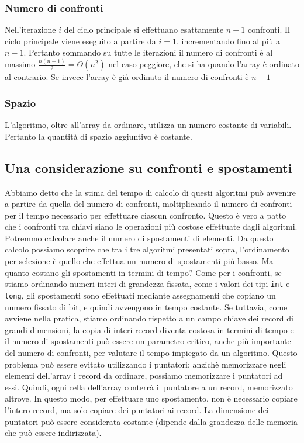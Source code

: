 \subsubsection*{Numero di confronti}
Nell'iterazione $i$ del ciclo principale si effettuano esattamente $n - 1$ confronti.
Il ciclo principale viene eseguito a partire da $i = 1$, incrementando fino al più
a $n - 1$. Pertanto sommando su tutte le iterazioni il numero di confronti è al massimo $\frac{n(n-1)}{2} = \Theta(n^2)$
nel caso peggiore, che si ha quando l'array è ordinato al contrario.
Se invece l'array è già ordinato il numero di confronti è $n - 1$ 

\subsubsection*{Spazio}
L'algoritmo, oltre all'array da ordinare, utilizza un numero costante di variabili.
Pertanto la quantità di spazio aggiuntivo è costante.
\clearpage

\subsection{Una considerazione su confronti e spostamenti}
Abbiamo detto che la stima del tempo di calcolo di questi algoritmi 
può avvenire a partire da quella del numero di confronti, 
moltiplicando il numero di confronti per il tempo necessario per 
effettuare ciascun confronto. Questo è vero a patto che i confronti tra chiavi 
siano le operazioni più costose effettuate dagli algoritmi. 
Potremmo calcolare anche il numero di spostamenti di elementi. 
Da questo calcolo possiamo scoprire che tra i tre algoritmi presentati sopra, l’ordinamento per selezione
è quello che effettua un numero di spostamenti più basso. 
Ma quanto costano gli spostamenti in termini di tempo? Come per i confronti, 
se stiamo ordinando numeri interi di grandezza fissata, come i valori dei tipi {\texttt{int}} e {\texttt{long}}, 
gli spostamenti sono effettuati mediante assegnamenti che copiano un numero fissato di bit, e quindi avvengono in tempo costante. 
Se tuttavia, come avviene nella pratica, stiamo ordinando rispetto a un campo chiave dei record di grandi dimensioni, 
la copia di interi record diventa costosa in termini di tempo e il numero di spostamenti può essere un parametro critico, 
anche più importante del numero di confronti, per valutare il tempo impiegato da un algoritmo.
Questo problema può essere evitato utilizzando i puntatori: 
anzichè memorizzare negli elementi dell’array i record da ordinare, 
possiamo memorizzare i puntatori ad essi. 
Quindi, ogni cella dell’array conterrà il puntatore a un record, memorizzato altrove. 
In questo modo, per effettuare uno spostamento, non è necessario copiare l’intero record, 
ma solo copiare dei puntatori ai record. La dimensione dei puntatori può essere considerata costante 
(dipende dalla grandezza delle memoria che può essere indirizzata).
\clearpage
